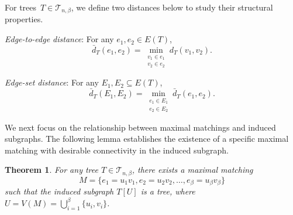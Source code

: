 \documentclass[12pt]{amsart}
\newtheorem{thm}{Theorem}[section]
\begin{document}
For trees \(T \in \mathcal{T}_{n,\beta}\), we define two distances below to study their structural properties.


\textit{Edge-to-edge distance}: For any $e_1, e_2 \in E(T)$,
    \[
    \bar{d}_T(e_1, e_2) = \min_{\substack{v_1 \in e_1 \\ v_2 \in e_2}} d_T(v_1, v_2).
    \]
    
  \textit{Edge-set distance}: For any $E_1, E_2 \subseteq E(T)$,
    \[
    \bar{d}_T(E_1, E_2) = \min_{\substack{e_1 \in E_1 \\ e_2 \in E_2}} \bar{d}_T(e_1, e_2).
    \]

We next focus on the relationship between maximal matchings and induced subgraphs. 
The following lemma establishes the existence of a specific maximal matching with desirable connectivity in the induced subgraph.
\begin{thm}\label{lem-2.7}
For any tree \( T \in \mathcal{T}_{n,\beta} \), there exists a maximal matching 
\[ M = \{e_1 = u_1v_1, e_2 = u_2v_2, \dots, e_\beta = u_\beta v_\beta\} \] 
such that the induced subgraph \( T[U] \) is a tree, where \( U = V(M) = \bigcup_{i=1}^\beta \{u_i, v_i\} \).
\end{thm}
\end{document}
